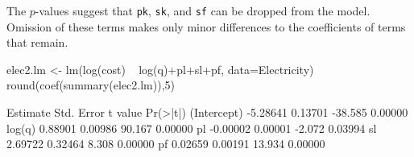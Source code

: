 \documentclass{tufte-book}\usepackage[]{graphicx}\usepackage[]{color}
\begin{document}
The $p$-values suggest that \texttt{pk}, \texttt{sk}, and \texttt{sf}
can be dropped from the model. Omission of these terms makes only
minor differences to the coefficients of terms that remain.
\begin{Schunk}
\begin{Sinput}
elec2.lm <- lm(log(cost) ~ log(q)+pl+sl+pf,
               data=Electricity)
round(coef(summary(elec2.lm)),5)
\end{Sinput}
\begin{Soutput}
            Estimate Std. Error t value Pr(>|t|)
(Intercept) -5.28641    0.13701 -38.585  0.00000
log(q)       0.88901    0.00986  90.167  0.00000
pl          -0.00002    0.00001  -2.072  0.03994
sl           2.69722    0.32464   8.308  0.00000
pf           0.02659    0.00191  13.934  0.00000
\end{Soutput}
\end{Schunk}
\end{document}
